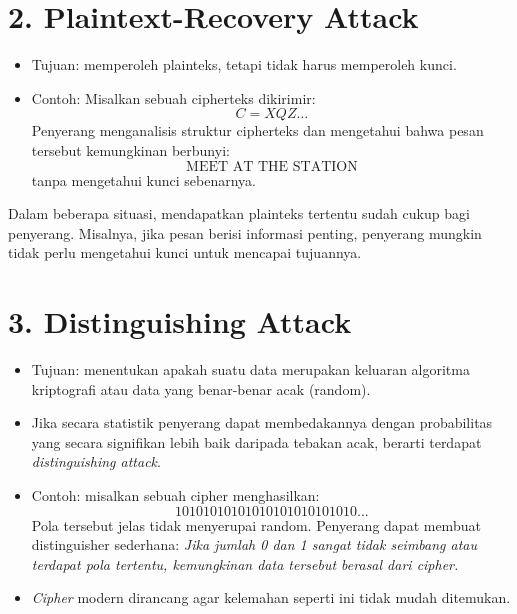 \documentclass{article}
\begin{document}
\newpage


\section*{2. Plaintext-Recovery Attack}

\begin{itemize}
    \item Tujuan: memperoleh plainteks, tetapi tidak harus memperoleh kunci.
    \item Contoh: Misalkan sebuah cipherteks dikirimir:
    \[ C = XQZ\dots \]
    Penyerang menganalisis struktur cipherteks dan mengetahui bahwa pesan tersebut kemungkinan berbunyi:
    \[ \text{MEET AT THE STATION} \]
    tanpa mengetahui kunci sebenarnya.
\end{itemize}

Dalam beberapa situasi, mendapatkan plainteks tertentu sudah cukup bagi penyerang. Misalnya, jika pesan berisi informasi penting, penyerang mungkin tidak perlu mengetahui kunci untuk mencapai tujuannya.

\newpage


\section*{3. Distinguishing Attack}

\begin{itemize}
    \item Tujuan: menentukan apakah suatu data merupakan keluaran algoritma kriptografi atau data yang benar-benar acak (random).
    \item Jika secara statistik penyerang dapat membedakannya dengan probabilitas yang secara signifikan lebih baik daripada tebakan acak, berarti terdapat \textit{distinguishing attack}.
    \vspace{5mm}
    \item Contoh: misalkan sebuah cipher menghasilkan:
    \[ 10101010101010101010101010... \]
    Pola tersebut jelas tidak menyerupai random.
    Penyerang dapat membuat distinguisher sederhana:
    \textit{Jika jumlah 0 dan 1 sangat tidak seimbang atau terdapat pola tertentu, kemungkinan data tersebut berasal dari cipher.}
    \vspace{5mm}
    \item \textit{Cipher} modern dirancang agar kelemahan seperti ini tidak mudah ditemukan.
\end{itemize}
\end{document}
